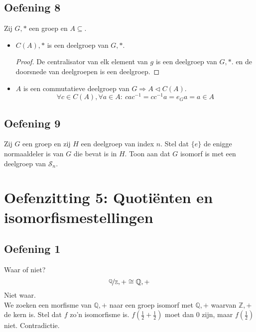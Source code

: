 \documentclass[main.tex]{subfiles}
\begin{document}
\subsection{Oefening 8}
\label{sec:oz4-oef8}
Zij $G,*$ een groep en $A\subseteq$.
\begin{itemize}
\item $C(A),*$ is een deelgroep van $G,*$.
  \begin{proof}
    De centralisator van elk element van $g$ is een deelgroep van $G,*$. en de doorsnede van deelgroepen is een deelgroep.
  \end{proof}
\item $A$ is een commutatieve deelgroep van $G \Rightarrow A \triangleleft C(A)$.
  \[ \forall c\in C(A), \forall a\in A:\ cac^{-1} = cc^{-1}a = e_{G}a = a \in A \]
\end{itemize}

\subsection{Oefening 9}
\label{sec:oz4-oef9}
Zij $G$ een groep en zij $H$ een deelgroep van index $n$.
Stel dat $\{e\}$ de enigge normaaldeler is van $G$ die bevat is in $H$.
Toon aan dat $G$ isomorf is met een deelgroep van $\mathcal{S}_{n}$.

\section{Oefenzitting 5: Quoti\"enten en isomorfismestellingen}

\subsection*{Oefening 1}
\label{sec:oz5-oef1}
Waar of niet?
\[ \nicefrac{\mathbb{Q}}{\mathbb{Z}},+ \cong \mathbb{Q},+ \]
Niet waar.\\
We zoeken een morfisme van $\mathbb{Q},+$ naar een groep isomorf met $\mathbb{Q},+$ waarvan $\mathbb{Z},+$ de kern is.
Stel dat $f$ zo'n isomorfisme is.
$f(\frac{1}{2} + \frac{1}{2})$ moet dan $0$ zijn, maar $f(\frac{1}{2})$ niet. Contradictie.
\end{document}
